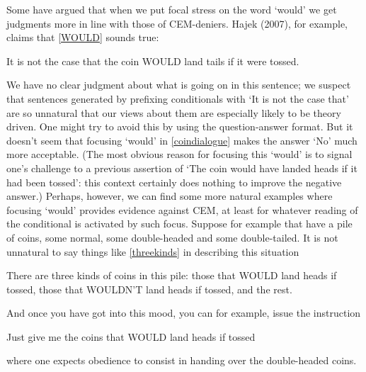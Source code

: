 \documentclass[leqno, 11pt, a5paper, openany]{article}
\begin{document}
Some have argued that when we put focal stress on the word ‘would’ we get judgments more in line with those of CEM-deniers. Hajek (2007), for example, claims that \ref{WOULD} sounds true:
\begin{prop}
\nitem \label{WOULD}
  It is not the case that the coin WOULD land tails if it were tossed.
\end{prop}
We have no clear judgment about what is going on in this sentence; we suspect that sentences generated by prefixing conditionals with ‘It is not the case that’ are so unnatural that our views about them are especially likely to be theory driven. One might try to avoid this by using the question-answer format. But it doesn't seem that focusing ‘would’ in \ref{coindialogue} makes the answer ‘No’ much more acceptable. (The most obvious reason for focusing this ‘would’ is to signal one's challenge to a previous assertion of ‘The coin would have landed heads if it had been tossed’: this context certainly does nothing to improve the negative answer.) Perhaps, however, we can find some more natural examples where focusing ‘would’ provides evidence against CEM, at least for whatever reading of the conditional is activated by such focus. Suppose for example that have a pile of coins, some normal, some double-headed and some double-tailed. It is not unnatural to say things like \ref{threekinds} in describing this situation
\begin{prop}
	\nitem \label{threekinds}
	There are three kinds of coins in this pile: those that WOULD land heads if tossed, those that WOULDN'T land heads if tossed, and the rest.
\end{prop}
And once you have got into this mood, you can for example, issue the instruction
\begin{prop}
\nitem \label{WOULDorder}
	Just give me the coins that WOULD land heads if tossed
\end{prop}
where one expects obedience to consist in handing over the double-headed coins.
\end{document}
